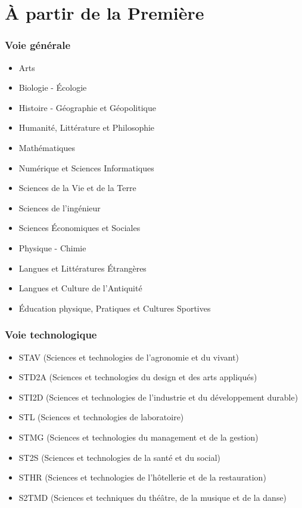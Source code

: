 \documentclass[svgnames,11pt]{beamer}
\begin{document}
\section{À partir de la Première}
\begin{frame}
    \frametitle{Voie générale}
\begin{itemize}
    \item Arts
    \item Biologie - Écologie
    \item Histoire - Géographie et Géopolitique
    \item Humanité, Littérature et Philosophie
    \item Mathématiques
    \item Numérique et Sciences Informatiques
    \item Sciences de la Vie et de la Terre
    \item Sciences de l'ingénieur
    \item Sciences Économiques et Sociales
    \item Physique - Chimie
    \item Langues et Littératures Étrangères
    \item Langues et Culture de l'Antiquité
    \item Éducation physique, Pratiques et Cultures Sportives
\end{itemize}

\end{frame}
\begin{frame}
    \frametitle{Voie technologique}

    \begin{itemize}
        \item STAV (Sciences et technologies de l'agronomie et du vivant)
        \item STD2A (Sciences et technologies du design et des arts appliqués)
        \item STI2D (Sciences et technologies de l'industrie et du développement durable)
        \item STL (Sciences et technologies de laboratoire)
        \item STMG (Sciences et technologies du management et de la gestion)
        \item ST2S (Sciences et technologies de la santé et du social)
        \item STHR (Sciences et technologies de l'hôtellerie et de la restauration)
        \item S2TMD (Sciences et techniques du théâtre, de la musique et de la danse)
    
    \end{itemize}

\end{frame}
\end{document}
